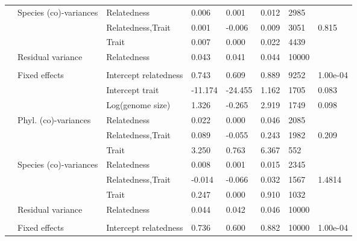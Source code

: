 \begin{longtable}[t]{llllllll}
\hspace{1em} & Species (co)-variances & Relatedness & 0.006 & 0.001 & 0.012 & 2985 & \\
\hspace{1em} &  & Relatedness,Trait & 0.001 & -0.006 & 0.009 & 3051 & 0.815\\
\hspace{1em} &  & Trait & 0.007 & 0.000 & 0.022 & 4439 & \\
\hspace{1em} & Residual variance & Relatedness & 0.043 & 0.041 & 0.044 & 10000 & \\
\addlinespace[0.3em]
\multicolumn{8}{l}{\textbf{Secretion systems}}\\
\hspace{1em} & Fixed effects & Intercept relatedness & 0.743 & 0.609 & 0.889 & 9252 & 1.00e-04\\
\hspace{1em} &  & Intercept trait & -11.174 & -24.455 & 1.162 & 1705 & 0.083\\
\hspace{1em} &  & Log(genome size) & 1.326 & -0.265 & 2.919 & 1749 & 0.098\\
\hspace{1em} & Phyl. (co)-variances & Relatedness & 0.022 & 0.000 & 0.046 & 2085 & \\
\hspace{1em} &  & Relatedness,Trait & 0.089 & -0.055 & 0.243 & 1982 & 0.209\\
\hspace{1em} &  & Trait & 3.250 & 0.763 & 6.367 & 552 & \\
\hspace{1em} & Species (co)-variances & Relatedness & 0.008 & 0.001 & 0.015 & 2345 & \\
\hspace{1em} &  & Relatedness,Trait & -0.014 & -0.066 & 0.032 & 1567 & 1.4814\\
\hspace{1em} &  & Trait & 0.247 & 0.000 & 0.910 & 1032 & \\
\hspace{1em} & Residual variance & Relatedness & 0.044 & 0.042 & 0.046 & 10000 & \\
\addlinespace[0.3em]
\multicolumn{8}{l}{\textbf{Quorum sensing}}\\
\hspace{1em} & Fixed effects & Intercept relatedness & 0.736 & 0.600 & 0.882 & 10000 & 1.00e-04\\

\end{longtable}
